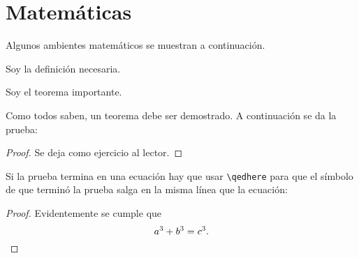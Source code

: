 \section{Matemáticas}

\noindent Algunos ambientes matemáticos se muestran a continuación.

\begin{definition}
    Soy la definición necesaria.
\end{definition}

\begin{theorem}
    Soy el teorema importante.
\end{theorem}

Como todos saben, un teorema debe ser demostrado. A continuación se da la prueba:

\begin{proof}
    Se deja como ejercicio al lector.
\end{proof}

Si la prueba termina en una ecuación hay que usar \texttt{\textbackslash{}qedhere} para que el símbolo de que terminó la prueba salga en la misma línea que la ecuación:

\begin{proof}
    Evidentemente se cumple que 
    \[
        a^3 + b^3 = c^3. \qedhere
    \]
\end{proof}